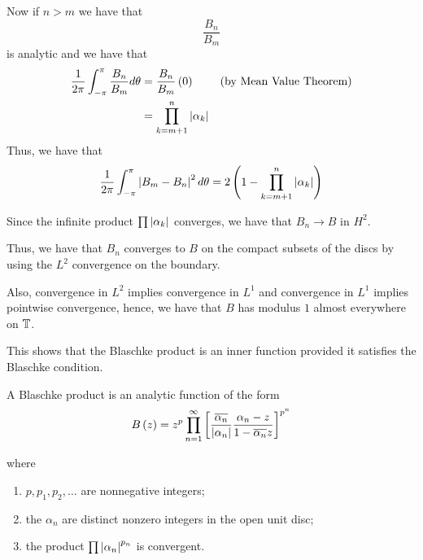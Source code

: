 Now if $n>m$ we have that 
\begin{equation*}
    \frac{B_{n}}{B_{m}}
\end{equation*}
is analytic and we have that
\begin{align*}
    \frac{1}{2\pi} \int_{-\pi}^{\pi} \frac{B_{n}}{B_{m}} d\theta &= \frac{B_n}{B_m} \left( 0 \right) & \text{(by Mean Value Theorem)} \\
    &= \prod_{k=m+1}^{n} \left\lvert \alpha_{k} \right\rvert &
\end{align*}
Thus, we have that
\begin{equation*}
    \frac{1}{2\pi} \int_{-\pi}^{\pi} \left\lvert B_{m}-B_{n} \right\rvert^{2} d\theta = 2\left( 1- \prod_{k=m+1}^{n} \left\lvert \alpha_{k} \right\rvert \right)
\end{equation*}

Since the infinite product $\prod \left\lvert \alpha_{k} \right\rvert$ converges, we have that $B_{n} \to B$ in $H^{2}$.

Thus, we have that $B_{n}$ converges to $B$ on the compact subsets of the discs by using the $L^2$ convergence on the boundary. 

Also, convergence in $L^{2}$ implies convergence in $L^{1}$ and convergence in $L^{1}$ implies pointwise convergence, hence, we have that $B$ has modulus $1$ almost everywhere on $\mathbb T$.

This shows that the Blaschke product is an inner function provided it satisfies the Blaschke condition.

\begin{definition}
    A Blaschke product is an analytic function of the form
    \begin{equation*}
	B\left( z \right) = z^{p} \prod_{n=1}^{\infty} \left[ \frac{\overline{\alpha_{n}}}{\left\lvert \alpha_{n} \right\rvert} \frac{\alpha_{n}-z}{1-\overline{\alpha_{n}}z} \right]^{p^{n}}
    \end{equation*}

    where
    \begin{enumerate}[label=(\roman*)]
	\item $p, p_{1}, p_{2}, \ldots$ are nonnegative integers;
	\item the $\alpha_{n}$ are distinct nonzero integers in the open unit disc;
	\item the product $\prod \left\lvert \alpha_{n} \right\rvert^{p_{n}}$ is convergent.
    \end{enumerate}
    \label{def:blaschke-product}
\end{definition}

